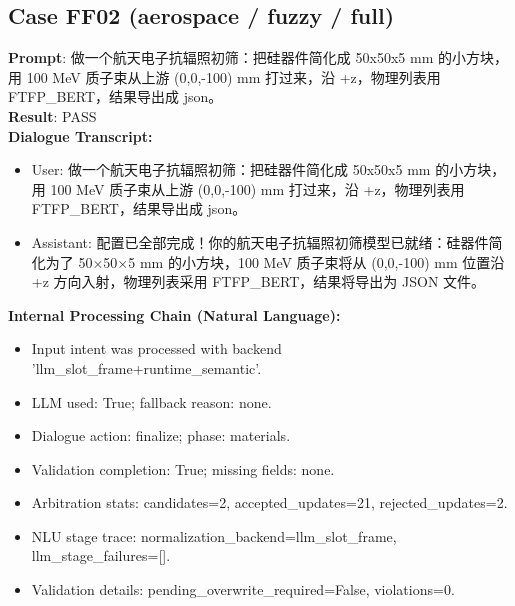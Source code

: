 \documentclass[11pt]{ctexart}
\begin{document}
\subsection{Case FF02 (aerospace / fuzzy / full)}
\textbf{Prompt}: 做一个航天电子抗辐照初筛：把硅器件简化成 50x50x5 mm 的小方块，用 100 MeV 质子束从上游 (0,0,-100) mm 打过来，沿 +z，物理列表用 FTFP\_BERT，结果导出成 json。\\
\textbf{Result}: PASS\\
\textbf{Dialogue Transcript:}
\begin{itemize}
\item User: 做一个航天电子抗辐照初筛：把硅器件简化成 50x50x5 mm 的小方块，用 100 MeV 质子束从上游 (0,0,-100) mm 打过来，沿 +z，物理列表用 FTFP\_BERT，结果导出成 json。
\item Assistant: 配置已全部完成！你的航天电子抗辐照初筛模型已就绪：硅器件简化为了 50×50×5 mm 的小方块，100 MeV 质子束将从 (0,0,-100) mm 位置沿 +z 方向入射，物理列表采用 FTFP\_BERT，结果将导出为 JSON 文件。
\end{itemize}
\textbf{Internal Processing Chain (Natural Language):}
\begin{itemize}
\item Input intent was processed with backend 'llm\_slot\_frame+runtime\_semantic'.
\item LLM used: True; fallback reason: none.
\item Dialogue action: finalize; phase: materials.
\item Validation completion: True; missing fields: none.
\item Arbitration stats: candidates=2, accepted\_updates=21, rejected\_updates=2.
\item NLU stage trace: normalization\_backend=llm\_slot\_frame, llm\_stage\_failures=[].
\item Validation details: pending\_overwrite\_required=False, violations=0.
\end{itemize}
\end{document}
